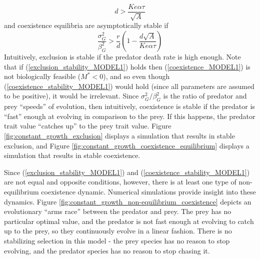 \documentclass{amsart}
\theoremstyle{definition}
\theoremstyle{remark}
\numberwithin{equation}{section}
\begin{document}
\begin{equation}
	\label{exclusion_stability_MODEL1}
	d > \frac{Ke\alpha\tau}{\sqrt{A}}
\end{equation}
and coexistence equilibria are asymptotically stable if
\begin{equation}
	\label{coexistence_stability_MODEL1}
	\frac{\sigma_G^2}{\beta_G^2} > \frac{r}{d}\left(1 - \frac{d\sqrt{A}}{Ke\alpha\tau}\right)
\end{equation}
Intuitively, exclusion is stable if the predator death rate is high enough.  Note that if (\ref{exclusion_stability_MODEL1}) holds then (\ref{coexistence_MODEL1}) is not biologically feasible ($M^* < 0$), and so even though (\ref{coexistence_stability_MODEL1}) would hold (since all parameters are assumed to be positive), it would be irrelevant.  Since $\sigma_G^2/\beta_G^2$ is the ratio of predator and prey ``speeds'' of evolution, then intuitively, coexistence is stable if the predator is ``fast'' enough at evolving in comparison to the prey.  If this happens, the predator trait value ``catches up'' to the prey trait value.  Figure \ref{fig:constant_growth_exclusion} displays a simulation that results in stable exclusion, and Figure \ref{fig:constant_growth_coexistence_equilibrium} displays a simulation that results in stable coexistence.

Since (\ref{exclusion_stability_MODEL1}) and (\ref{coexistence_stability_MODEL1}) are not equal and opposite conditions, however, there is at least one type of non-equilibrium coexistence dynamic.  Numerical simulations provide insight into these dynamics.  Figure \ref{fig:constant_growth_non-equilibrium_coexistence} depicts an evolutionary ``arms race'' between the predator and prey.  The prey has no particular optimal value, and the predator is not fast enough at evolving to catch up to the prey, so they continuously evolve in a linear fashion.  There is no stabilizing selection in this model - the prey species has no reason to stop evolving, and the predator species has no reason to stop chasing it.
\end{document}
